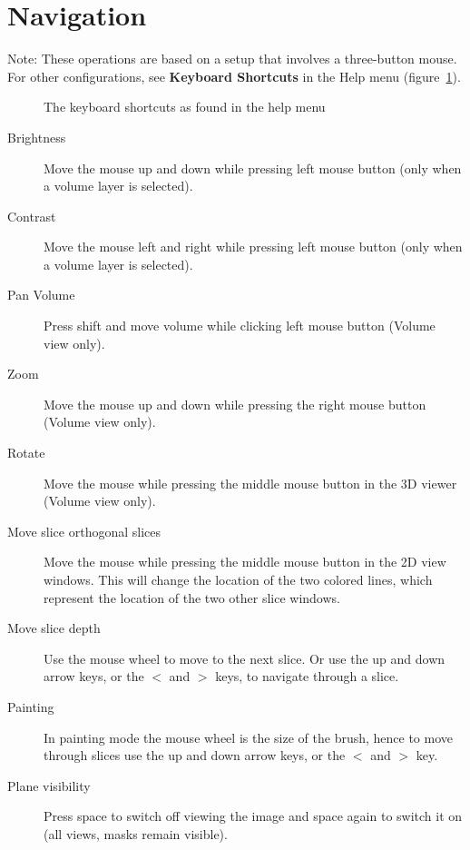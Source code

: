 \documentclass[fleqn,11pt,openany]{book}
\begin{document}
\section{Navigation}

Note: These operations are based on a setup that involves a three-button mouse. For other configurations, see {\bf Keyboard Shortcuts} in the Help menu (figure~\ref{fig:KeyboardShortcuts}).

\begin{figure}
\caption{The keyboard shortcuts as found in the help menu}\label{fig:KeyboardShortcuts}
\end{figure}

\begin{description}
\item[Brightness] Move the mouse up and down while pressing left mouse button (only when a volume layer is selected).

\item[Contrast] Move the mouse left and right while pressing left mouse button (only when a volume layer is selected).

\item[Pan Volume] Press shift and move volume while clicking left mouse button (Volume view only).

\item[Zoom] Move the mouse up and down while pressing the right mouse button (Volume view only).

\item[Rotate] Move the mouse while pressing the middle mouse button in the 3D viewer (Volume view only).

\item[Move slice orthogonal slices] Move the mouse while pressing the middle mouse button in the 2D view windows. This will change the location of the two colored lines, which represent the location of the two other slice windows. 

\item[Move slice depth] Use the mouse wheel to move to the next slice. Or use the up and down arrow keys, or the {\bf $<$} and {\bf $>$} keys, to navigate through a slice.

\item[Painting] In painting mode the mouse wheel is the size of the brush, hence to move through slices use the up and down arrow keys, or the  {\bf $<$} and {\bf  $>$} key. 

\item[Plane visibility] Press space to switch off viewing the image and space again to switch it on (all views, masks remain visible).
 
\end{description}
\end{document}
